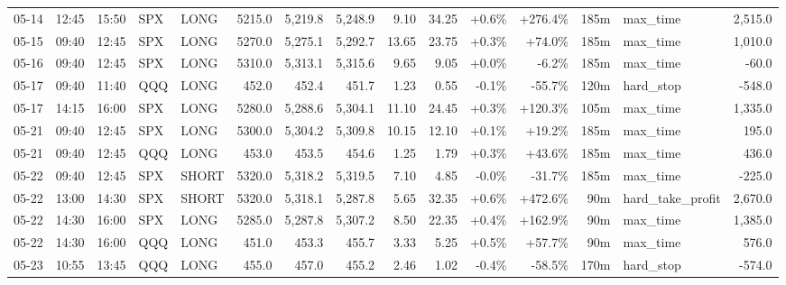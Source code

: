\documentclass[11pt,a4paper,twoside]{article}
\begin{document}
\begin{landscape}
\begin{center}
\begin{longtable}{>{\color{txtmain}}l l l l l r r r r r r r r >{\color{txtmain}}l r}
05-14 & 12:45 & 15:50 & SPX & LONG & 5215.0 & 5,219.8 & 5,248.9 & 9.10 & 34.25 & \textcolor{wingreen}{+0.6\%} & \textcolor{wingreen}{+276.4\%} & 185m & max\_time & \textcolor{wingreen}{2,515.0} \\
05-15 & 09:40 & 12:45 & SPX & LONG & 5270.0 & 5,275.1 & 5,292.7 & 13.65 & 23.75 & \textcolor{wingreen}{+0.3\%} & \textcolor{wingreen}{+74.0\%} & 185m & max\_time & \textcolor{wingreen}{1,010.0} \\
05-16 & 09:40 & 12:45 & SPX & LONG & 5310.0 & 5,313.1 & 5,315.6 & 9.65 & 9.05 & \textcolor{wingreen}{+0.0\%} & \textcolor{lossred}{-6.2\%} & 185m & max\_time & \textcolor{lossred}{-60.0} \\
05-17 & 09:40 & 11:40 & QQQ & LONG & 452.0 & 452.4 & 451.7 & 1.23 & 0.55 & \textcolor{lossred}{-0.1\%} & \textcolor{lossred}{-55.7\%} & 120m & hard\_stop & \textcolor{lossred}{-548.0} \\
05-17 & 14:15 & 16:00 & SPX & LONG & 5280.0 & 5,288.6 & 5,304.1 & 11.10 & 24.45 & \textcolor{wingreen}{+0.3\%} & \textcolor{wingreen}{+120.3\%} & 105m & max\_time & \textcolor{wingreen}{1,335.0} \\
05-21 & 09:40 & 12:45 & SPX & LONG & 5300.0 & 5,304.2 & 5,309.8 & 10.15 & 12.10 & \textcolor{wingreen}{+0.1\%} & \textcolor{wingreen}{+19.2\%} & 185m & max\_time & \textcolor{wingreen}{195.0} \\
05-21 & 09:40 & 12:45 & QQQ & LONG & 453.0 & 453.5 & 454.6 & 1.25 & 1.79 & \textcolor{wingreen}{+0.3\%} & \textcolor{wingreen}{+43.6\%} & 185m & max\_time & \textcolor{wingreen}{436.0} \\
05-22 & 09:40 & 12:45 & SPX & SHORT & 5320.0 & 5,318.2 & 5,319.5 & 7.10 & 4.85 & \textcolor{lossred}{-0.0\%} & \textcolor{lossred}{-31.7\%} & 185m & max\_time & \textcolor{lossred}{-225.0} \\
05-22 & 13:00 & 14:30 & SPX & SHORT & 5320.0 & 5,318.1 & 5,287.8 & 5.65 & 32.35 & \textcolor{wingreen}{+0.6\%} & \textcolor{wingreen}{+472.6\%} & 90m & hard\_take\_profit & \textcolor{wingreen}{2,670.0} \\
05-22 & 14:30 & 16:00 & SPX & LONG & 5285.0 & 5,287.8 & 5,307.2 & 8.50 & 22.35 & \textcolor{wingreen}{+0.4\%} & \textcolor{wingreen}{+162.9\%} & 90m & max\_time & \textcolor{wingreen}{1,385.0} \\
05-22 & 14:30 & 16:00 & QQQ & LONG & 451.0 & 453.3 & 455.7 & 3.33 & 5.25 & \textcolor{wingreen}{+0.5\%} & \textcolor{wingreen}{+57.7\%} & 90m & max\_time & \textcolor{wingreen}{576.0} \\
05-23 & 10:55 & 13:45 & QQQ & LONG & 455.0 & 457.0 & 455.2 & 2.46 & 1.02 & \textcolor{lossred}{-0.4\%} & \textcolor{lossred}{-58.5\%} & 170m & hard\_stop & \textcolor{lossred}{-574.0} \\

\end{longtable}
\end{center}
\end{landscape}
\end{document}
